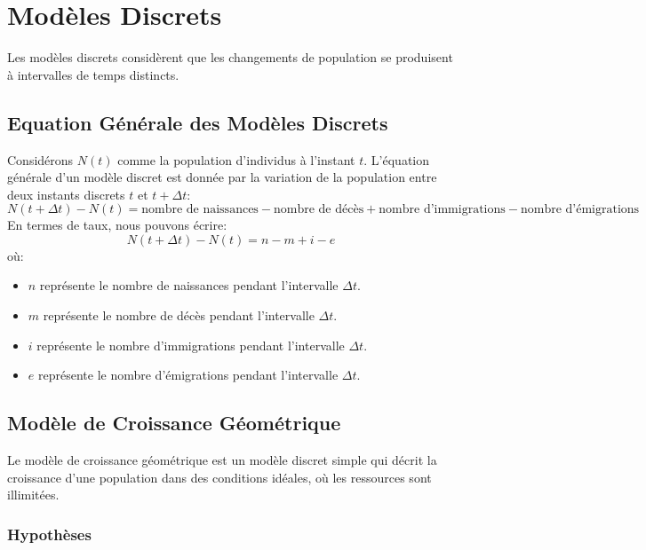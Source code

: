 \documentclass{article}
\begin{document}
\sloppy

\section{Modèles Discrets}

Les modèles discrets considèrent que les changements de population se produisent à intervalles de temps distincts.

\subsection{Equation Générale des Modèles Discrets}

Considérons $N(t)$ comme la population d'individus à l'instant $t$. L'équation générale d'un modèle discret est donnée par la variation de la population entre deux instants discrets $t$ et $t + \Delta t$:
\[
N(t + \Delta t) - N(t) = \text{nombre de naissances} - \text{nombre de décès} + \text{nombre d'immigrations} - \text{nombre d'émigrations}
\]
En termes de taux, nous pouvons écrire:
\[
N(t + \Delta t) - N(t) = n - m + i - e
\]
où:
\begin{itemize}
    \item $n$ représente le nombre de naissances pendant l'intervalle $\Delta t$.
    \item $m$ représente le nombre de décès pendant l'intervalle $\Delta t$.
    \item $i$ représente le nombre d'immigrations pendant l'intervalle $\Delta t$.
    \item $e$ représente le nombre d'émigrations pendant l'intervalle $\Delta t$.
\end{itemize}

\subsection{Modèle de Croissance Géométrique}

Le modèle de croissance géométrique est un modèle discret simple qui décrit la croissance d'une population dans des conditions idéales, où les ressources sont illimitées.

\subsubsection{Hypothèses}
\end{document}

